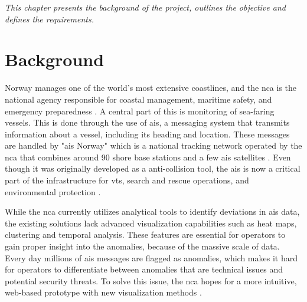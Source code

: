 





\textit{This chapter presents the background of the project, outlines the objective and defines the requirements.}

\section{Background}
Norway manages one of the world's most extensive coastlines, and the \gls{nca} is the national agency responsible for coastal management, maritime safety, and emergency preparedness \parencite{kystverket_nca_role}.
A central part of this is monitoring of sea-faring vessels. This is done through the use of \acrfull{ais}, a messaging system that transmits information about a vessel, including its heading and location.
These messages are handled by "\acrshort{ais} Norway" which is a national tracking network operated by the \acrshort{nca} that combines around 90 shore base stations and a few \acrshort{ais} satellites \parencite{kystverket_ais_norge}.
Even though it was originally developed as a anti-collision tool, the \acrshort{ais} is now a critical part of the infrastructure for \acrfull{vts}, search and rescue operations, and environmental protection \parencite{barentswatch_ais_status_report}.


While the \acrshort{nca} currently utilizes analytical tools to identify deviations in \acrshort{ais} data, the existing solutions lack advanced visualization capabilities such as heat maps, clustering and temporal analysis. These features are essential for operators to gain proper insight into the anomalies, because of the massive scale of data. Every day millions of \acrshort{ais} messages are flagged as anomalies, which makes it hard for operators to differentiate between anomalies that are technical issues and potential security threats. To solve this issue, the \acrshort{nca} hopes for a more intuitive, web-based prototype with new visualization methods \parencite{kystverket_ais_norge}.

